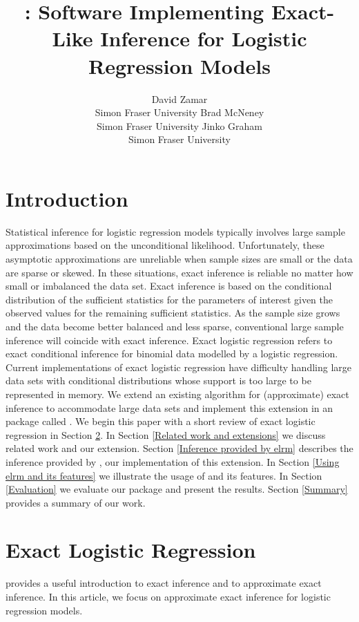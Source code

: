 \documentclass[article, shortnames]{jss}
\author{David Zamar \\
Simon Fraser University \And Brad McNeney \\
Simon Fraser University \And Jinko Graham \\
Simon Fraser University}
\title{\pkg{elrm}: Software Implementing Exact-Like Inference for Logistic Regression Models}
\begin{document}
\section{Introduction} \label{Introduction}

Statistical inference for logistic regression models typically
involves large sample approximations based on the unconditional
likelihood. Unfortunately, these asymptotic approximations are
unreliable when sample sizes are small or the data are sparse or
skewed. In these situations, exact inference is reliable no matter
how small or imbalanced the data set. Exact inference is based on
the conditional distribution of the sufficient statistics for the
parameters of interest given the observed values for the remaining
sufficient statistics. As the sample size grows and the data
become better balanced and less sparse, conventional large sample
inference will coincide with exact inference. Exact logistic
regression refers to exact conditional inference for binomial data
modelled by a logistic regression. Current implementations of
exact logistic regression have difficulty handling large data sets
with conditional distributions whose support is too large to be
represented in memory. We extend an existing algorithm for
(approximate) exact inference to accommodate large data sets and
implement this extension in an  package called
. We begin this paper with a short review of exact
logistic regression in Section \ref{Exact logistic regression}. In
Section \ref{Related work and extensions} we discuss related work
and our extension. Section \ref{Inference provided by elrm}
describes the inference provided by , our implementation
of this extension. In Section \ref{Using elrm and its features} we
illustrate the usage of  and its features. In Section
\ref{Evaluation} we evaluate our package and present the results.
Section \ref{Summary} provides a summary of our work.

\section{Exact Logistic Regression} \label{Exact logistic regression}

\citet{Hirji:2006} provides a useful introduction to
exact inference and to approximate exact inference.
In this article, we focus on approximate exact inference
for logistic regression models.
\end{document}
